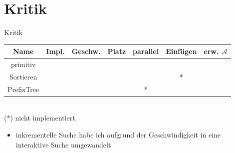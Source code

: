 \documentclass[11pt, xcolor=dvipsnames]{beamer}
\begin{document}
	\section{Kritik}
	\begin{frame}{Kritik}
		\centering
		\begin{tabular}{c|cccccc}
			\textbf{Name}	&  Impl. & Geschw. & Platz & parallel & Einfügen & erw. $\mathcal{A}$ \\ 
			\hline
			primitiv	& \cellcolor{green} & \cellcolor{orange}  & \cellcolor{green}& \cellcolor{green} & \cellcolor{green} & \cellcolor{green} \\ 
			Sortieren	& \cellcolor{yellow} & \cellcolor{green} & \cellcolor{yellow} & \cellcolor{yellow} & \cellcolor{orange} * & \cellcolor{green} \\
			PrefixTree & \cellcolor{orange}  & \cellcolor{red} & \cellcolor{red} &\cellcolor{orange} * & \cellcolor{green} & \cellcolor{yellow}
		\end{tabular}\\
		(*) nicht implementiert. 
		
		\begin{itemize}
			\item inkrementelle Suche habe ich aufgrund der Geschwindigkeit in eine interaktive Suche umgewandelt
		\end{itemize}
	\end{frame}
\end{document}

